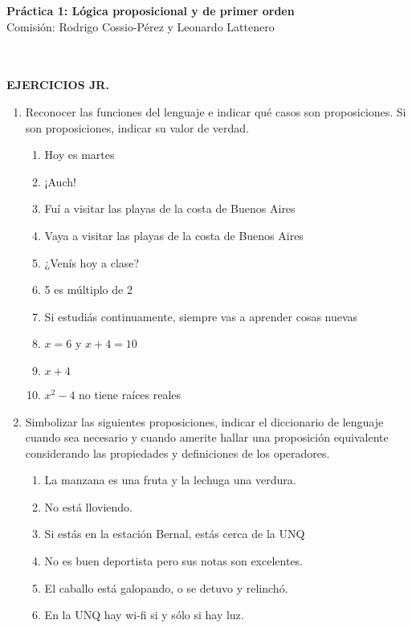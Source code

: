 \documentclass[a4paper]{article}
\newcommand{\exercise}{\item}
\begin{document}
\noindent \hrulefill 
\vspace{-7pt}
\begin{center} 
	\textbf{ Práctica 1: Lógica proposicional y de primer orden } \\
	Comisión: Rodrigo Cossio-Pérez y Leonardo Lattenero
\end{center}
\vspace{-10pt}
\hrulefill \\
\phantom{~} \\
\textbf{EJERCICIOS JR.}
\begin{enumerate}
	\exercise Reconocer las funciones del lenguaje e indicar qué casos son proposiciones. Si son proposiciones, indicar su valor de verdad.
	\begin{multicols}{2}
	\begin{enumerate} [label=(\alph*)]
		\item Hoy es martes 
		\item ¡Auch!
		\item Fuí a visitar las playas de la costa de Buenos Aires 
		\item Vaya a visitar las playas de la costa de Buenos Aires
		\item ¿Venís hoy a clase?
		\item 5 es múltiplo de 2 
		\item Si estudiás continuamente, siempre vas a aprender cosas nuevas 
		\item $x=6$ y $x+4=10$ 
		\item $x+4$ 
		\item $x^2-4$ no tiene raíces reales 
	\end{enumerate}
	\end{multicols}
	\exercise Simbolizar las siguientes proposiciones, indicar el diccionario de lenguaje cuando sea necesario y cuando amerite hallar una proposición equivalente considerando las propiedades y definiciones de los operadores.
	\begin{multicols}{2}
	\begin{enumerate} [label=(\alph*)]
		\item La manzana es una fruta y la lechuga una verdura. 
		\item No está lloviendo. 
		\item Si estás en la estación Bernal, estás cerca de la UNQ 
		\item No es buen deportista pero sus notas son excelentes.
		\item El caballo está galopando, o se detuvo y relinchó.
		\item En la UNQ hay wi-fi si y sólo si hay luz.

\end{enumerate}
\end{multicols}
\end{enumerate}
\end{document}
